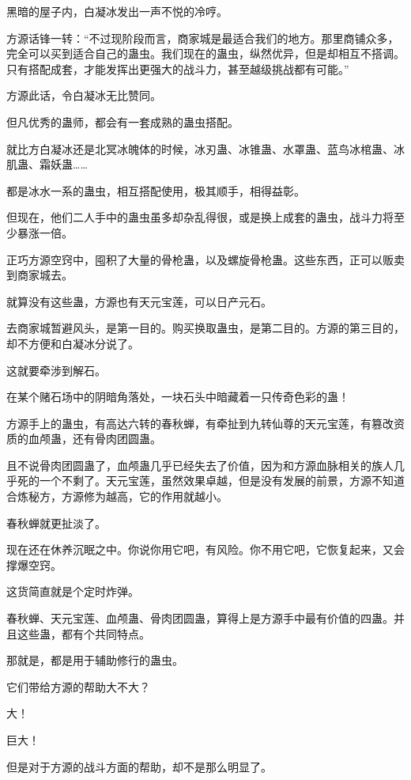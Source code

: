 
\begin{this_body}

黑暗的屋子内，白凝冰发出一声不悦的冷哼。

方源话锋一转：“不过现阶段而言，商家城是最适合我们的地方。那里商铺众多，完全可以买到适合自己的蛊虫。我们现在的蛊虫，纵然优异，但是却相互不搭调。只有搭配成套，才能发挥出更强大的战斗力，甚至越级挑战都有可能。”

方源此话，令白凝冰无比赞同。

但凡优秀的蛊师，都会有一套成熟的蛊虫搭配。

就比方白凝冰还是北冥冰魄体的时候，冰刃蛊、冰锥蛊、水罩蛊、蓝鸟冰棺蛊、冰肌蛊、霜妖蛊……

都是冰水一系的蛊虫，相互搭配使用，极其顺手，相得益彰。

但现在，他们二人手中的蛊虫虽多却杂乱得很，或是换上成套的蛊虫，战斗力将至少暴涨一倍。

正巧方源空窍中，囤积了大量的骨枪蛊，以及螺旋骨枪蛊。这些东西，正可以贩卖到商家城去。

就算没有这些蛊，方源也有天元宝莲，可以日产元石。

去商家城暂避风头，是第一目的。购买换取蛊虫，是第二目的。方源的第三目的，却不方便和白凝冰分说了。

这就要牵涉到解石。

在某个赌石场中的阴暗角落处，一块石头中暗藏着一只传奇色彩的蛊！

方源手上的蛊虫，有高达六转的春秋蝉，有牵扯到九转仙尊的天元宝莲，有篡改资质的血颅蛊，还有骨肉团圆蛊。

且不说骨肉团圆蛊了，血颅蛊几乎已经失去了价值，因为和方源血脉相关的族人几乎死的一个不剩了。天元宝莲，虽然效果卓越，但是没有发展的前景，方源不知道合炼秘方，方源修为越高，它的作用就越小。

春秋蝉就更扯淡了。

现在还在休养沉眠之中。你说你用它吧，有风险。你不用它吧，它恢复起来，又会撑爆空窍。

这货简直就是个定时炸弹。

春秋蝉、天元宝莲、血颅蛊、骨肉团圆蛊，算得上是方源手中最有价值的四蛊。并且这些蛊，都有个共同特点。

那就是，都是用于辅助修行的蛊虫。

它们带给方源的帮助大不大？

大！

巨大！

但是对于方源的战斗方面的帮助，却不是那么明显了。


\end{this_body}
